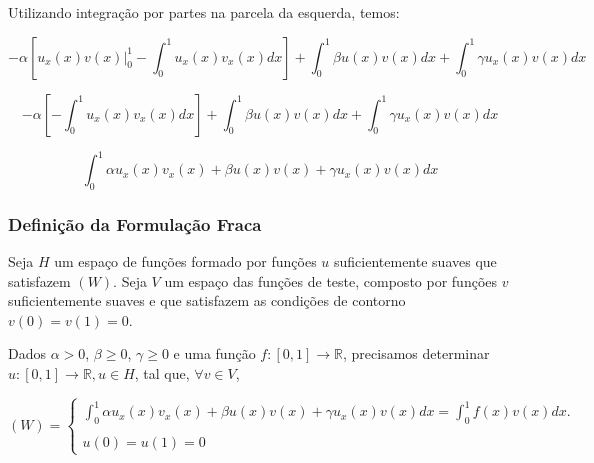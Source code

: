 \begin{frame}
  Utilizando integração por partes na parcela da esquerda, temos:

  \[-\alpha \left[u_{x}(x)v(x) \bigg|^{1}_{0} - \int^{1}_{0} u_{x}(x)v_{x}(x) dx\right] + \int^{1}_{0} \beta u(x)v(x) dx + \int^{1}_{0} \gamma u_{x}(x)v(x) dx\]

  \vspace{0.3cm}

  \[-\alpha \left[- \int^{1}_{0} u_{x}(x)v_{x}(x) dx\right] + \int^{1}_{0} \beta u(x)v(x) dx + \int^{1}_{0} \gamma u_{x}(x)v(x) dx\]

  \vspace{0.3cm}

  \[\int^{1}_{0} \alpha u_{x}(x)v_{x}(x)  + \beta u(x)v(x) + \gamma  u_{x}(x)v(x) dx\]
\end{frame}

\begin{frame}[fragile]
  \frametitle{Definição da Formulação Fraca}

  Seja $H$ um espaço de funções formado por funções $u$ suficientemente suaves que satisfazem $(W)$. Seja $V$ um espaço das funções de teste, composto por funções $v$ suficientemente suaves e que satisfazem as condições de contorno $v(0) = v(1) = 0$.

  \vspace{0.3cm}

  Dados $\alpha > 0$, $\beta \geq 0$, $\gamma \geq 0$ e uma função $f : [0,1] \to \mathbb{R}$, precisamos determinar $u : [0,1] \to \mathbb{R}, u \in H$, tal que, $\forall v \in V$,

  \[(W) = \begin{cases} \displaystyle \int^{1}_{0} \alpha u_{x}(x)v_{x}(x) + \beta u(x)v(x) + \gamma u_{x}(x)v(x) dx = \int^{1}_{0} f(x)v(x) dx.\\
    \\
    u(0) = u(1) = 0
  \end{cases}\]

\end{frame}

